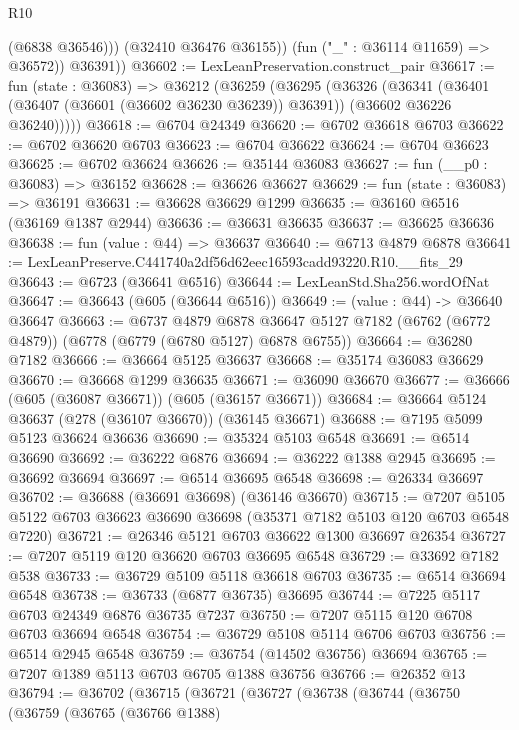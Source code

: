 \begin{lexlean}{R10}
\begin{coremodule}
                (@6838 @36546)))
            (@32410 @36476 @36155))
          (fun ("_" : @36114 @11659) => @36572))
        @36391))
@36602 := LexLeanPreservation.construct_pair
@36617 := fun (state : @36083) =>
  @36212
    (@36259
      (@36295
        (@36326
          (@36341
            (@36401 (@36407 (@36601 (@36602 @36230 @36239)) @36391))
            (@36602 @36226 @36240)))))
@36618 := @6704 @24349
@36620 := @6702 @36618 @6703
@36622 := @6702 @36620 @6703
@36623 := @6704 @36622
@36624 := @6704 @36623
@36625 := @6702 @36624
@36626 := @35144 @36083
@36627 := fun (__p0 : @36083) => @36152
@36628 := @36626 @36627
@36629 := fun (state : @36083) => @36191
@36631 := @36628 @36629 @1299
@36635 := @36160 @6516 (@36169 @1387 @2944)
@36636 := @36631 @36635
@36637 := @36625 @36636
@36638 := fun (value : @44) => @36637
@36640 := @6713 @4879 @6878
@36641 := LexLeanPreserve.C441740a2df56d62eec16593cadd93220.R10.__fits_29
@36643 := @6723 (@36641 @6516)
@36644 := LexLeanStd.Sha256.wordOfNat
@36647 := @36643 (@605 (@36644 @6516))
@36649 := (value : @44) -> @36640 @36647
@36663 := @6737
    @4879
    @6878
    @36647
    @5127
    @7182
    (@6762 (@6772 @4879))
    (@6778 (@6779 (@6780 @5127) @6878 @6755))
@36664 := @36280 @7182
@36666 := @36664 @5125 @36637
@36668 := @35174 @36083 @36629
@36670 := @36668 @1299 @36635
@36671 := @36090 @36670
@36677 := @36666 (@605 (@36087 @36671)) (@605 (@36157 @36671))
@36684 := @36664 @5124 @36637 (@278 (@36107 @36670)) (@36145 @36671)
@36688 := @7195 @5099 @5123 @36624 @36636
@36690 := @35324 @5103 @6548
@36691 := @6514 @36690
@36692 := @36222 @6876
@36694 := @36222 @1388 @2945
@36695 := @36692 @36694
@36697 := @6514 @36695 @6548
@36698 := @26334 @36697
@36702 := @36688 (@36691 @36698) (@36146 @36670)
@36715 := @7207 @5105 @5122 @6703 @36623 @36690 @36698 (@35371 @7182 @5103 @120 @6703 @6548 @7220)
@36721 := @26346 @5121 @6703 @36622 @1300 @36697 @26354
@36727 := @7207 @5119 @120 @36620 @6703 @36695 @6548
@36729 := @33692 @7182 @538
@36733 := @36729 @5109 @5118 @36618 @6703
@36735 := @6514 @36694 @6548
@36738 := @36733 (@6877 @36735) @36695
@36744 := @7225 @5117 @6703 @24349 @6876 @36735 @7237
@36750 := @7207 @5115 @120 @6708 @6703 @36694 @6548
@36754 := @36729 @5108 @5114 @6706 @6703
@36756 := @6514 @2945 @6548
@36759 := @36754 (@14502 @36756) @36694
@36765 := @7207 @1389 @5113 @6703 @6705 @1388 @36756
@36766 := @26352 @13
@36794 := @36702
    (@36715
      (@36721
        (@36727
          (@36738
            (@36744
              (@36750
                (@36759
                  (@36765
                    (@36766 @1388)

\end{coremodule}
\end{lexlean}
